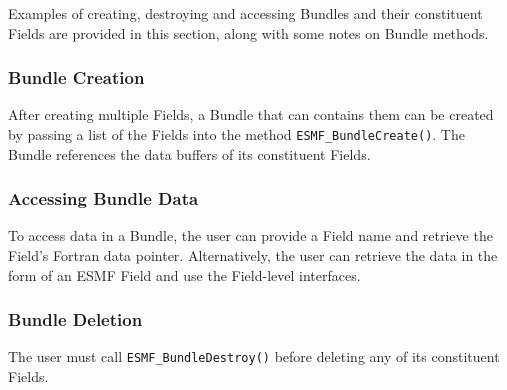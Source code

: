 

Examples of creating, destroying and accessing Bundles and their
constituent Fields are provided in this section, along with some
notes on Bundle methods.

\subsubsection{Bundle Creation}

After creating multiple Fields, a Bundle that can contains them 
can be created by passing a list of the Fields into the 
method {\tt ESMF\_BundleCreate()}.  The Bundle references the 
data buffers of its constituent Fields.  

\subsubsection{Accessing Bundle Data}

To access data in a Bundle, the user can provide a Field
name and retrieve the Field's Fortran data pointer.  Alternatively,
the user can retrieve the data in the form of an ESMF 
Field and use the Field-level interfaces.

\subsubsection{Bundle Deletion}

The user must call {\tt ESMF\_BundleDestroy()} before 
deleting any of its constituent Fields.  

